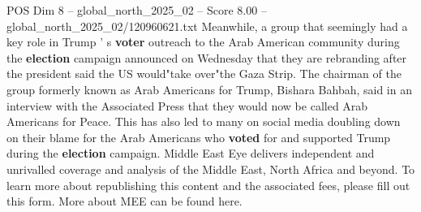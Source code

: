 \begin{textsample}{POS Dim 8 – global\_north\_2025\_02 – Score 8.00 – global\_north\_2025\_02/120960621.txt}
Meanwhile, a group that seemingly had a key role in Trump ' s \textbf{voter} outreach to the Arab American community during the \textbf{election} campaign announced on Wednesday that they are rebranding after the president said the US would"take over"the Gaza Strip.
The chairman of the group formerly known as Arab Americans for Trump, Bishara Bahbah, said in an interview with the Associated Press that they would now be called Arab Americans for Peace.
This has also led to many on social media doubling down on their blame for the Arab Americans who \textbf{voted} for and supported Trump during the \textbf{election} campaign.
Middle East Eye delivers independent and unrivalled coverage and analysis of the Middle East, North Africa and beyond.
To learn more about republishing this content and the associated fees, please fill out this form.
More about MEE can be found here.

\end{textsample}
